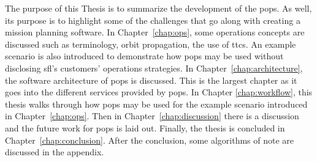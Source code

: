 The purpose of this Thesis is to summarize the development of the
\acrlong{pops}. As well, its purpose is to highlight some of the challenges
that go along with creating a mission planning software. In
Chapter~\ref{chap:ops}, some operations concepts are discussed such as
terminology, orbit propagation, the use of \glspl{ttc}. An example scenario is
also introduced to demonstrate how \gls{pops} may be used without disclosing
\gls{sfl}'s customers' operations strategies. In
Chapter~\ref{chap:architecture}, the software architecture of \gls{pops} is
discussed. This is the largest chapter as it goes into the different services
provided by \gls{pops}. In Chapter \ref{chap:workflow}, this thesis walks through how
\gls{pops} may be used for the example scenario introduced in
Chapter~\ref{chap:ops}. Then in Chapter~\ref{chap:discussion} there is a
discussion and the future work for \gls{pops} is laid out. Finally, the thesis
is concluded in Chapter~\ref{chap:conclusion}.  After the conclusion, some
algorithms of note are discussed in the appendix.

